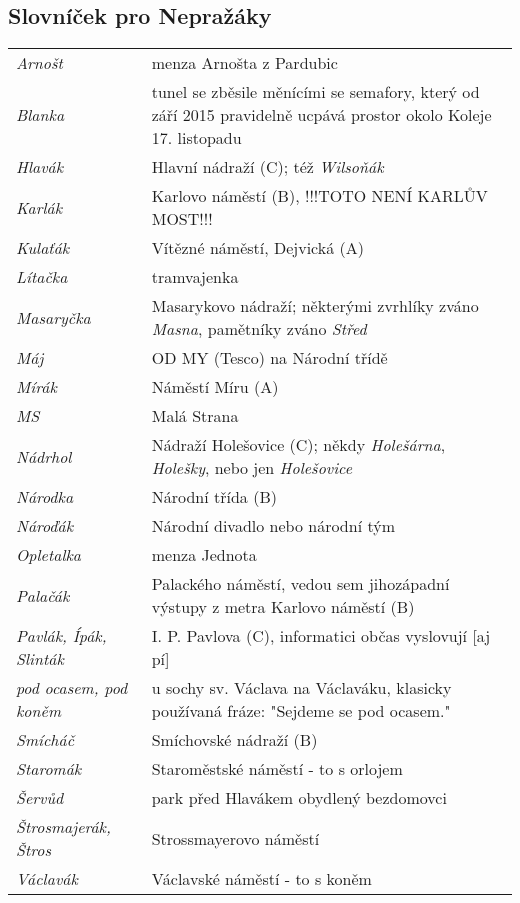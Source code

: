 \subsection{Slovníček pro Nepražáky}
\vglue -12pt
\begin{longtable}{l p{8.5cm}}
    \textit{Arnošt} & menza Arnošta z Pardubic \\
    \textit{Blanka} & tunel se zběsile měnícími se semafory, který od září 2015
        pravidelně ucpává prostor okolo Koleje 17. listopadu \\
    \textit{Hlavák} & Hlavní nádraží (C); též \textit{Wilsoňák} \\
    \textit{Karlák} & Karlovo náměstí (B), !!!TOTO NENÍ KARLŮV MOST!!! \\
    \textit{Kulaťák} & Vítězné náměstí, Dejvická (A) \\
    \textit{Lítačka} & tramvajenka \\
    \textit{Masaryčka} & Masarykovo nádraží; některými zvrhlíky zváno
    \textit{Masna}, pamětníky zváno \textit{Střed} \\
    \textit{Máj} & OD MY (Tesco) na Národní třídě \\
    \textit{Mírák} & Náměstí Míru (A) \\
    \textit{MS} & Malá Strana \\
    \textit{Nádrhol} & Nádraží Holešovice (C); někdy \textit{Holešárna},
    \textit{Holešky}, nebo jen \textit{Holešovice} \\
    \textit{Národka} & Národní třída (B) \\
    \textit{Nároďák} & Národní divadlo nebo národní tým \\
    \textit{Opletalka} & menza Jednota \\
    \textit{Palačák} & Palackého náměstí, vedou sem jihozápadní výstupy z
        metra Karlovo náměstí (B) \\
    \textit{Pavlák, Ípák, Slinták} & I. P. Pavlova (C), informatici občas
        vyslovují [aj pí] \\
    \textit{pod ocasem, pod koněm} & u sochy sv. Václava na Václaváku, klasicky
        používaná fráze: "Sejdeme se pod ocasem." \\
    \textit{Smícháč} & Smíchovské nádraží (B) \\
    \textit{Staromák} & Staroměstské náměstí - to s orlojem \\
    \textit{Šervůd} & park před Hlavákem obydlený bezdomovci \\
    \textit{Štrosmajerák, Štros} & Strossmayerovo náměstí \\
    \textit{Václavák} & Václavské náměstí - to s koněm
\end{longtable}